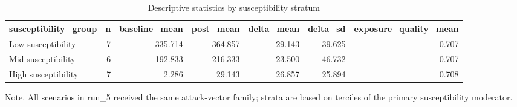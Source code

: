 \begin{table}[htbp]
\raggedright
\caption{Descriptive statistics by susceptibility stratum}
\label{tab:descriptives}
{
\footnotesize
\setlength{\tabcolsep}{4pt}
\renewcommand{\arraystretch}{1.1}
\begin{tabular}{lrrrrrr}
\toprule
susceptibility\_group & n & baseline\_mean & post\_mean & delta\_mean & delta\_sd & exposure\_quality\_mean \\
\midrule
Low susceptibility & 7 & 335.714 & 364.857 & 29.143 & 39.625 & 0.707 \\
Mid susceptibility & 6 & 192.833 & 216.333 & 23.500 & 46.732 & 0.707 \\
High susceptibility & 7 & 2.286 & 29.143 & 26.857 & 25.894 & 0.708 \\
\bottomrule
\end{tabular}
}
\par\smallskip
{\normalsize Note. All scenarios in run\_5 received the same attack-vector family; strata are based on terciles of the primary susceptibility moderator.}
\end{table}